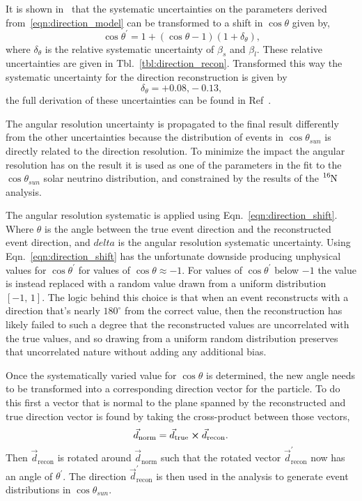 It is shown in~\citep{pierre_luc_thesis} that the systematic uncertainties on the
parameters derived from~\eqref{eqn:direction_model} can be transformed to a shift
in $\cos\theta$ given by,
\begin{equation}
    \cos\theta^{\prime} = 1+(\cos\theta-1)(1+\delta_{\theta})\text{,}
    \label{eqn:direction_shift}
\end{equation}
where $\delta_{\theta}$ is the relative systematic uncertainty of $\beta_{s}$ and $\beta_{l}$.
These relative uncertainties are given in Tbl.~\ref{tbl:direction_recon}.
Transformed this way the systematic uncertainty for the direction reconstruction
is given by
\begin{equation*}
    \delta_{\theta} = +0.08\text{,} -0.13\text{,}
\end{equation*}
the full derivation of these uncertainties can be found in Ref~\citep{snop_water_unidoc}.

The angular resolution uncertainty is propagated to the final result
differently from the other
uncertainties because the distribution of events in $\cos\theta_{sun}$ is
directly related to the direction resolution.  To minimize the impact the
angular resolution has on the result it is used as one of the parameters in the
fit to the $\cos\theta_{sun}$ solar neutrino distribution, and constrained by
the results of the $\ce{^{16}N}$ analysis.

The angular resolution systematic is applied using Eqn.~\eqref{eqn:direction_shift}.
Where $\theta$ is the angle between the true event direction and the reconstructed
event direction, and $delta$ is the angular resolution systematic uncertainty.
Using Eqn.~\eqref{eqn:direction_shift} has the unfortunate downside producing
unphysical values for $\cos\theta^{\prime}$ for values of $\cos\theta\approx-1$.
For values of $\cos\theta^{\prime}$ below $-1$ the value is instead replaced
with a random value drawn from a uniform distribution $\left[-1\text{, }1\right]$.
The logic behind this choice is that when an event reconstructs with a direction
that's nearly $180^{\circ}$ from the correct value, then the reconstruction
has likely failed to such a degree that the reconstructed values are uncorrelated
with the true values, and so drawing from a uniform random distribution preserves
that uncorrelated nature without adding any additional bias.

Once the systematically varied value for $\cos\theta$ is determined, the new angle
needs to be transformed into a corresponding direction vector for the particle.
To do this first a vector that is normal to the plane spanned by the reconstructed
and true direction vector is found by taking the cross-product between those vectors,
\begin{equation}
    \vec{d}_{\mathrm{norm}} = \vec{d}_{\mathrm{true}} \cross \vec{d}_{\mathrm{recon}}\text{.}
\end{equation}
Then $\vec{d}_{\mathrm{recon}}$ is rotated around $\vec{d}_{\mathrm{norm}}$
such that the rotated vector $\vec{d}^{\prime}_{\mathrm{recon}}$ now has an angle
of $\theta^{\prime}$.
The direction $\vec{d}^{\prime}_{\mathrm{recon}}$ is then used in the
analysis to generate event distributions in $\cos\theta_{sun}$.

